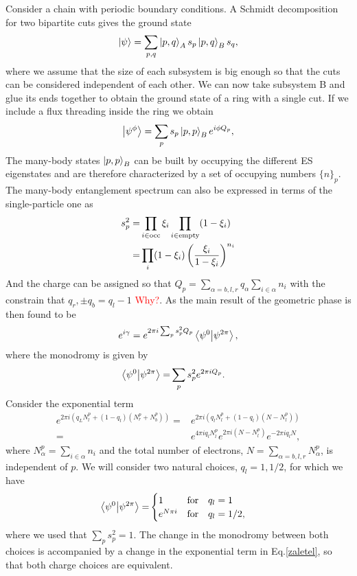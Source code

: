 \documentclass[prb,twocolumn,amsmath,longbibliography,amssymb,superscriptaddress]{revtex4-1}
\begin{document}
Consider a chain with periodic boundary conditions. A Schmidt decomposition for two bipartite cuts gives the ground state
\begin{equation}
\ket{\psi} = \sum_{p,q} \ket{p,q}_A s_p \ket{p,q}_B s_q,
\end{equation}
where we assume that the size of each subsystem is big enough so that the cuts can be considered independent of each other. We can now take subsystem B and glue its ends together to obtain the ground state of a ring with a single cut. If we include a flux threading inside the ring we obtain
\begin{equation}
\ket{\psi^\phi} = \sum_p s_p \ket{p,p}_B e^{i\phi Q_p},
\end{equation}
The many-body states $\ket{p,p}_B$ can be built by occupying the different ES eigenstates and are therefore characterized by a set of occupying numbers $\{n\}_p$. The many-body entanglement spectrum can also be expressed in terms of the single-particle one \cite{Alexandrinata2011} as
\begin{align}
s_p^2 =& \prod_{i \in {\rm occ}} \xi_i \prod_{i \in {\rm empty}}(1-\xi_i) \\
=& \prod_i (1-\xi_i)\left(\frac{\xi_i}{1-\xi_i} \right)^{n_i}
\end{align}
And the charge can be assigned so that $Q_p = \sum_{\alpha = b,l,r} q_\alpha\sum_{i \in \alpha} n_i$ with the constrain that $q_r,\pm q_b = q_l-1$ \textcolor{red}{Why?}. As the main result of \cite{Zaletel2014} the geometric phase is then found to be
\begin{align}
e^{i\gamma} = e^{2\pi i \sum_p s_p^2 Q_p}  \bra{\psi^0}\ket{\psi^{2\pi}},
\label{zaletel}
\end{align}
where the monodromy is given by
\begin{align}
\bra{\psi^0}\ket{\psi^{2\pi}} =& \sum_p s_p^2 e^{2\pi i Q_p}.
\end{align}
Consider the exponential term
\begin{align*}
e^{2\pi i (q_L N^p_l + (1-q_l)(N^p_r+N^p_b))} =& e^{2\pi i (q_l N^p_l + (1-q_l)(N-N^p_l))} \\
=& e^{4\pi i q_l N^p_l}e^{2 \pi i (N-N^p_l)}e^{-2\pi i q_l N },
\end{align*}
where $N^p_\alpha = \sum_{i \in \alpha} n_i$ and the total number of electrons, $N = \sum_{\alpha = b,l,r} N^p_\alpha$, is independent of $p$. We will consider two natural choices, $q_l = 1,1/2$, for which we have
\begin{align}
\bra{\psi^0}\ket{\psi^{2\pi}} =& 
\begin{cases}
1 & \text{for} \quad q_l = 1 \\
e^{N\pi i} & \text{for} \quad q_l = 1/2,
\end{cases}
\end{align}
where we used that $\sum_p s_p^2 = 1$. The change in the monodromy between both choices is accompanied by a change in the exponential term in Eq.\ref{zaletel}, so that both charge choices are equivalent.
\end{document}
